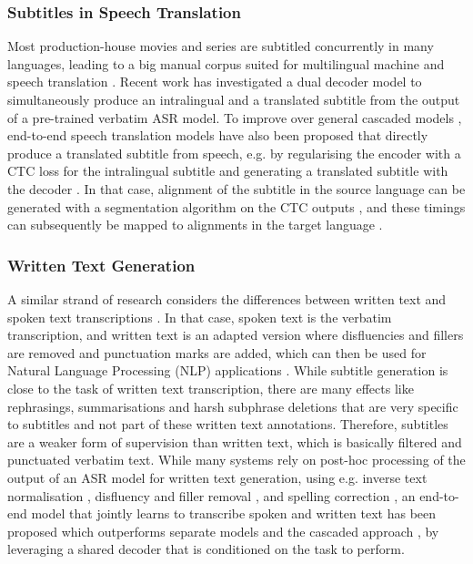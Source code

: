 \subsubsection{Subtitles in Speech Translation}
\noindent Most production-house movies and series are subtitled concurrently in many languages, leading to a big manual corpus suited for multilingual machine and speech translation \cite{MustCinema}. Recent work \cite{xu-etal-2022-joint} has investigated a dual decoder model to simultaneously produce an intralingual and a translated subtitle from the output of a pre-trained verbatim ASR model. To improve over general cascaded models \cite{che2017}, end-to-end speech translation models have also been proposed that directly produce a translated subtitle from speech, e.g. by regularising the encoder with a CTC loss for the intralingual subtitle and generating a translated subtitle with the decoder \cite{papi-etal-2023-direct-speech}. In that case, alignment of the subtitle in the source language can be generated with a segmentation algorithm on the CTC outputs \cite{kurzinger2020}, and these timings can subsequently be mapped to alignments in the target language \cite{papi-etal-2023-direct-speech}.

\subsubsection{Written Text Generation}
\noindent A similar strand of research considers the differences between written text and spoken text transcriptions \cite{ihori-etal-2020-parallel, liao23, ihori23_interspeech}. In that case, spoken text is the verbatim transcription, and written text is an adapted version where disfluencies and fillers are removed and punctuation marks are added, which can then be used for Natural Language Processing (NLP) applications \cite{nozaki22_interspeech, futami23_icassp}. While subtitle generation is close to the task of written text transcription, there are many effects like rephrasings, summarisations and harsh subphrase deletions that are very specific to subtitles and not part of these written text annotations. Therefore, subtitles are a weaker form of supervision than written text, which is basically filtered and punctuated verbatim text. While many systems rely on post-hoc processing of the output of an ASR model for written text generation, using e.g. inverse text normalisation \cite{sunkara21_icassp}, disfluency and filler removal \cite{wang-etal-2022-adaptive}, and spelling correction \cite{guo19_icassp}, an end-to-end model that jointly learns to transcribe spoken and written text has been proposed which outperforms separate models and the cascaded approach \cite{ihori23_interspeech}, by leveraging a shared decoder that is conditioned on the task to perform.

